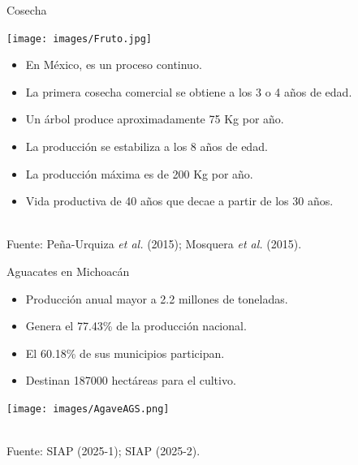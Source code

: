 \documentclass[aspectratio=169]{beamer}
\begin{document}
\begin{frame}{Cosecha}
    \vspace{-1cm}
    \begin{minipage}{0.5\textwidth}
			\hspace{-0.5cm}
            \centering
            \texttt{[image: images/Fruto.jpg]}
		\end{minipage}%
		\begin{minipage}{0.5\textwidth}
            \begin{block}{}
                \begin{itemize}
                    \item En México, es un proceso continuo.
				\item La primera cosecha comercial se obtiene a los 3 o 4 años de edad.
                    \item Un árbol produce aproximadamente 75 Kg por año.  
                    \item La producción se estabiliza a los 8 años de edad.
                    \item La producción máxima es de 200 Kg por año.
                    \item Vida productiva de 40 años que decae a partir de los 30 años.
			\end{itemize}
            \end{block}
		\end{minipage}
        \,\\
        \hfill {\scriptsize Fuente: Peña-Urquiza \textit{et al.} (2015); Mosquera \textit{et al.} (2015).}
\end{frame}


\begin{frame}{Aguacates en Michoacán}
    \vspace{-1cm}
		\begin{minipage}{0.5\textwidth}
            \begin{block}{}
                \begin{itemize}
				\item Producción anual mayor a 2.2 millones de toneladas.
                    \item Genera el 77.43\% de la producción nacional.
                    \item El 60.18\% de sus municipios participan.
                    \item Destinan 187000 hectáreas para el cultivo.
			\end{itemize}
            \end{block}
		\end{minipage}%
        \begin{minipage}{0.5\textwidth}
\hspace{-0.5cm}\texttt{[image: images/AgaveAGS.png]}
		\end{minipage}%
        \,\\
        \hfill {\scriptsize Fuente: SIAP (2025-1); SIAP (2025-2).}
\end{frame}
\end{document}

